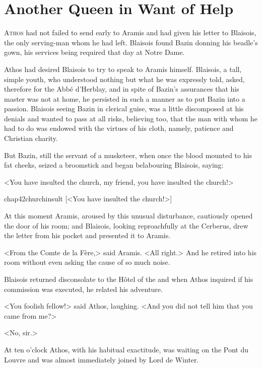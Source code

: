 \chapter{Another Queen in Want of Help}

 \lettrine{A}{thos} had not failed to send early to Aramis and had given his letter to Blaisois, the only serving-man whom he had left. Blaisois found Bazin donning his beadle's gown, his services being required that day at Notre Dame.

\zz
Athos had desired Blaisois to try to speak to Aramis himself. Blaisois, a tall, simple youth, who understood nothing but what he was expressly told, asked, therefore for the Abbé d'Herblay, and in spite of Bazin's assurances that his master was not at home, he persisted in such a manner as to put Bazin into a passion. Blaisois seeing Bazin in clerical guise, was a little discomposed at his denials and wanted to pass at all risks, believing too, that the man with whom he had to do was endowed with the virtues of his cloth, namely, patience and Christian charity.

But Bazin, still the servant of a musketeer, when once the blood mounted to his fat cheeks, seized a broomstick and began belabouring Blaisois, saying:

<You have insulted the church, my friend, you have insulted the church!>

\begin{bwbigpic}
	[\basicscale] 
	{chap42churchinsult}
	[<You have insulted the church!>]
\end{bwbigpic}

At this moment Aramis, aroused by this unusual disturbance, cautiously opened the door of his room; and Blaisois, looking reproachfully at the Cerberus, drew the letter from his pocket and presented it to Aramis.

<From the Comte de la Fère,> said Aramis. <All right.> And he retired into his room without even asking the cause of so much noise.

Blaisois returned disconsolate to the Hôtel of the  and when Athos inquired if his commission was executed, he related his adventure.

<You foolish fellow!> said Athos, laughing. <And you did not tell him that you came from me?>

<No, sir.>

At ten o'clock Athos, with his habitual exactitude, was waiting on the Pont du Louvre and was almost immediately joined by Lord de Winter.


